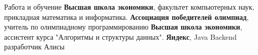 \begin{rubric}{Работа и обучение}
\entry*[\textbf{2019 -- 2023}]
	\textbf{Высшая школа экономики}, факультет компьютерных наук, прикладная математика и информатика.
\entry*[\textbf{2019 -- 2020}]
	\textbf{Ассоциация победителей олимпиад}, учитель по олимпиадному программированию
\entry*[\textbf{2020 -- 2021}]
    \textbf{Высшая школа экономики}, ассистент курса "Алгоритмы и структуры данных".
\entry*[\textbf{2020 -- н.в.}]
	\textbf{Яндекс}, Java Backend разработчик Алисы
\end{rubric}
